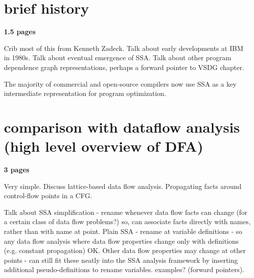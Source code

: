 
\section{brief history}

\textbf{1.5 pages}

Crib most of this from Kenneth Zadeck. 
Talk about early developments at IBM in 1980s.
Talk about eventual emergence of SSA.
Talk about other program dependence graph
representations, perhaps a forward pointer to 
VSDG chapter.

The majority of commercial and open-source compilers
now use SSA as a key intermediate representation for
program optimization.


\section{comparison with dataflow analysis (high level overview of DFA)}

\textbf{3 pages}

Very simple. Discuss lattice-based data flow analysis.
Propagating facts around control-flow points in a CFG.

Talk about SSA simplification - rename whenever data flow
facts can change (for a certain class of data flow problems?)
so, can associate facts directly with names, rather than with
name at point.
Plain SSA - rename at variable definitions - so any data flow
analysis where data flow properties change only with definitions
(e.g. constant propagation) OK. Other data flow properties may 
change at other points - can still fit these neatly into the SSA
analysis framework by inserting additional pseudo-definitions
to rename variables. examples? (forward pointers).


